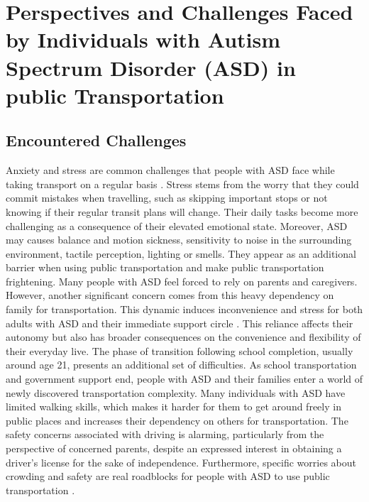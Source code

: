 \section{Perspectives and Challenges Faced by Individuals with Autism Spectrum Disorder (ASD) in public Transportation}
    
\subsection{Encountered Challenges}

    Anxiety and stress are common challenges that people with ASD face while taking transport on a regular basis \cite{haas_experiences_nodate}. Stress stems from the worry that they could commit mistakes when travelling, such as skipping important stops or not knowing if their regular transit plans will change. Their daily tasks become more challenging as a consequence of their elevated emotional state. 
    Moreover, ASD may causes balance and motion sickness, sensitivity to noise in the surrounding environment, tactile perception, lighting or smells. They appear as an additional barrier when using public transportation and make public transportation frightening.
\newline
\newline
    Many people with ASD feel forced to rely on parents and caregivers. However, another significant concern comes from this heavy dependency on family for transportation. This dynamic induces inconvenience and stress for both adults with ASD and their immediate support circle \cite{deka_co-principal_nodate}. This reliance affects their autonomy but also has broader consequences on the convenience and flexibility of their everyday live. 
    The phase of transition following school completion, usually around age 21, presents an additional set of difficulties. As school transportation and government support end,  people with ASD and their families enter a world of newly discovered transportation complexity.
    Many individuals with ASD have limited walking skills, which makes it harder for them to get around freely in public places and increases their dependency on others for transportation.
    The safety concerns associated with driving is alarming, particularly from the perspective of concerned parents, despite an expressed interest in obtaining a driver's license for the sake of independence. 
\newline
\newline
    Furthermore, specific worries about crowding and safety are real roadblocks for people with ASD to use public transportation \cite{falkmer_viewpoints_2015}.
    

